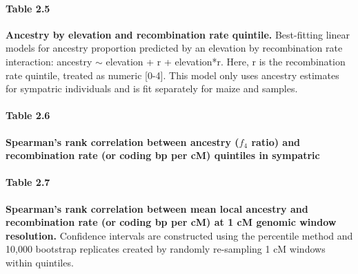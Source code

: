\paragraph*{Table 2.5}
\label{tbl_elev_r_interaction_5}
{\bf Ancestry by elevation and recombination rate quintile.} Best-fitting linear models for ancestry proportion predicted by an elevation by recombination rate interaction: \mexicana ancestry $\sim$ elevation + r + elevation*r. Here, r is the recombination rate quintile, treated as numeric [0-4]. This model only uses ancestry estimates for sympatric individuals and is fit separately for maize and \mexicana samples.


\paragraph*{Table 2.6}
\label{spearmans_rho_f4_sympatric_mexicana_pop22}
{\bf Spearman's rank correlation between ancestry ($f_4$ ratio) and recombination rate (or coding bp per cM) quintiles in sympatric \mexicana}
{}

\paragraph*{Table 2.7}
\label{spearmans_rho_local_ancestry}
{\bf Spearman's rank correlation between mean \mexicana local ancestry and recombination rate (or coding bp per cM) at 1 cM genomic window resolution.} Confidence intervals are constructed using the percentile method and 10,000 bootstrap replicates created by randomly re-sampling 1 cM windows within quintiles.


\newpage

\clearpage


